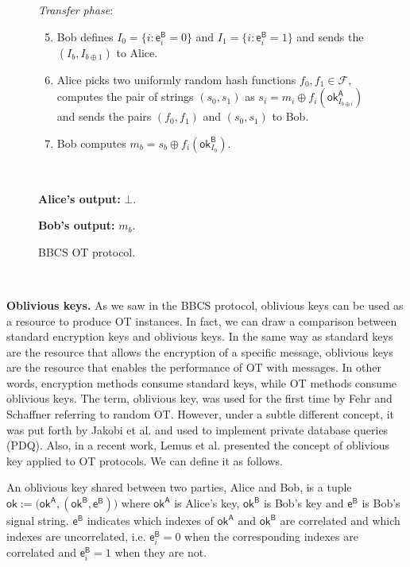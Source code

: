 \begin{figure}[h!]
\begin{tcolorbox}
            \textit{Transfer phase}:
            \begin{enumerate}
            \setcounter{enumi}{4}
                \item Bob defines $I_0 = \{ i : \mathsf{e}^{\mathsf{B}}_i = 0 \}$ and $I_1 = \{ i : \mathsf{e}^{\mathsf{B}}_i = 1 \}$ and sends the $(I_b, I_{b\oplus 1})$ to Alice.
                \item Alice picks two uniformly random hash functions $f_0, f_1 \in \mathcal{F}$, computes the pair of strings $(s_0, s_1)$ as $s_i = m_i \oplus f_i(\mathsf{ok}^{\mathsf{A}}_{I_{b\oplus i}})$ and sends the pairs $(f_0, f_1)$ and $(s_0, s_1)$ to Bob.
                \item Bob computes $m_b = s_b \oplus  f_i(\mathsf{ok}^{\mathsf{B}}_{I_0})$. 
            \end{enumerate}
            
            \
            
        \textbf{Alice's output:} $\bot$.
        
        \textbf{Bob's output:} $m_b$.
        
        \end{tcolorbox}
    \caption{BBCS OT protocol.}
    \label{fig:BBCS}
\end{figure}

\

\noindent\textbf{Oblivious keys.}  As we saw in the BBCS protocol, oblivious keys can be used as a resource to produce OT instances. In fact, we can draw a comparison between standard encryption keys and oblivious keys. In the same way as standard keys are the resource that allows the encryption of a specific message, oblivious keys are the resource that enables the performance of OT with messages. In other words, encryption methods consume standard keys, while OT methods consume oblivious keys. The term, oblivious key, was used for the first time by Fehr and Schaffner \cite{FS09} referring to random OT. However, under a subtle different concept, it was put forth by Jakobi et al. \cite{JSGBBWZ11} and used to implement private database queries (PDQ). Also, in a recent work, Lemus et al. \cite{Lemus20} presented the concept of oblivious key applied to OT protocols. We can define it as follows.

\begin{definition}
An oblivious key shared between two parties, Alice and Bob, is a tuple $\mathsf{ok}:= \big( \mathsf{ok}^{\mathsf{A}}, (\mathsf{ok}^{\mathsf{B}}, \mathsf{e}^{\mathsf{B}}) \big)$ where $\mathsf{ok}^{\mathsf{A}}$ is Alice's key, $\mathsf{ok}^{\mathsf{B}}$ is Bob's key and $\mathsf{e}^{\mathsf{B}}$ is Bob's signal string. $\mathsf{e}^{\mathsf{B}}$ indicates which indexes of $\mathsf{ok}^{\mathsf{A}}$ and $\mathsf{ok}^{\mathsf{B}}$ are correlated and which indexes are uncorrelated, i.e. $\mathsf{e}^{\mathsf{B}}_i = 0$ when the corresponding indexes are correlated and $\mathsf{e}^{\mathsf{B}}_i = 1$ when they are not.
\label{def:ok}
\end{definition}

